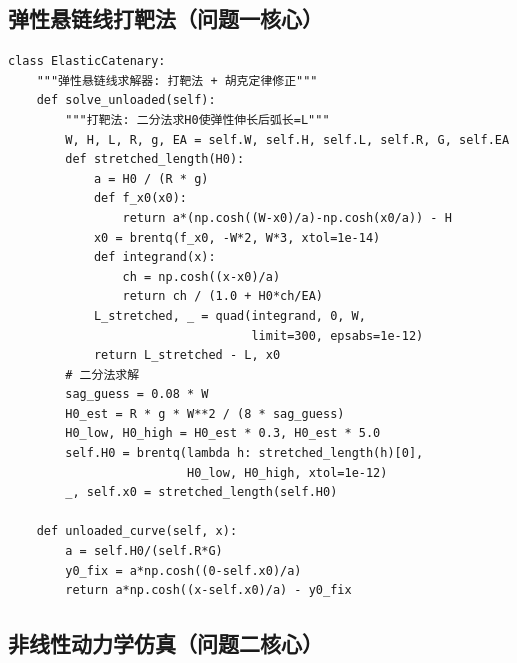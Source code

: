 \documentclass[12pt,a4paper]{ctexart}
\begin{document}
\subsection{弹性悬链线打靶法（问题一核心）}

{\small
\begin{lstlisting}
class ElasticCatenary:
    """弹性悬链线求解器: 打靶法 + 胡克定律修正"""
    def solve_unloaded(self):
        """打靶法: 二分法求H0使弹性伸长后弧长=L"""
        W, H, L, R, g, EA = self.W, self.H, self.L, self.R, G, self.EA
        def stretched_length(H0):
            a = H0 / (R * g)
            def f_x0(x0):
                return a*(np.cosh((W-x0)/a)-np.cosh(x0/a)) - H
            x0 = brentq(f_x0, -W*2, W*3, xtol=1e-14)
            def integrand(x):
                ch = np.cosh((x-x0)/a)
                return ch / (1.0 + H0*ch/EA)
            L_stretched, _ = quad(integrand, 0, W,
                                  limit=300, epsabs=1e-12)
            return L_stretched - L, x0
        # 二分法求解
        sag_guess = 0.08 * W
        H0_est = R * g * W**2 / (8 * sag_guess)
        H0_low, H0_high = H0_est * 0.3, H0_est * 5.0
        self.H0 = brentq(lambda h: stretched_length(h)[0],
                         H0_low, H0_high, xtol=1e-12)
        _, self.x0 = stretched_length(self.H0)

    def unloaded_curve(self, x):
        a = self.H0/(self.R*G)
        y0_fix = a*np.cosh((0-self.x0)/a)
        return a*np.cosh((x-self.x0)/a) - y0_fix
\end{lstlisting}
}

\subsection{非线性动力学仿真（问题二核心）}
\end{document}

